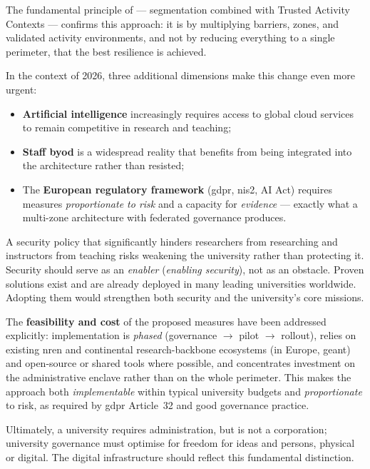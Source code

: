 The fundamental principle of  ---
segmentation combined with Trusted Activity Contexts --- confirms this
approach: it is by multiplying barriers, zones, and validated activity
environments, and not by reducing everything to a single perimeter,
that the best resilience is achieved.

In the context of 2026, three additional dimensions make this
change even more urgent:
\begin{itemize}[nosep]
    \item \textbf{Artificial intelligence} increasingly requires access
    to global cloud services to remain competitive in research and
    teaching;
    \item \textbf{Staff \gls{byod}} is a widespread reality
    that benefits from being integrated into the architecture rather than resisted;
    \item The \textbf{European regulatory framework} (\gls{gdpr}, \gls{nis2}, AI Act)
    requires measures \emph{proportionate to risk} and a capacity for
    \emph{evidence} --- exactly what a multi-zone architecture
    with federated governance produces.
\end{itemize}

A security policy that significantly hinders researchers from researching and
instructors from teaching risks weakening the university rather than protecting it.
Security should serve as an \emph{enabler} (\emph{enabling security}),
not as an obstacle. Proven solutions exist and are already
deployed in many leading universities worldwide. Adopting them would
strengthen both security and the university's core missions.

\medskip
\noindent
The \textbf{feasibility and cost} of the proposed measures have been
addressed explicitly: implementation is \emph{phased} (governance
$\rightarrow$ pilot $\rightarrow$ rollout), relies on existing
\gls{nren} and continental research-backbone ecosystems (in Europe,
\gls{geant}) and open-source or shared tools where possible,
and concentrates investment on the administrative enclave rather than
on the whole perimeter. This makes the approach both \emph{implementable}
within typical university budgets and \emph{proportionate} to risk, as
required by \gls{gdpr} Article~32 and good governance practice.

\medskip
\noindent
Ultimately, a university requires administration, but is not a corporation;
university governance must optimise for freedom for ideas and persons,
physical or digital. The digital infrastructure should reflect this
fundamental distinction.
